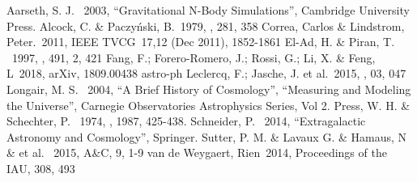 \documentclass[preprint]{aastex62}
\begin{document}
  \begin{thebibliography}{}

     Aarseth, S. J. \ 2003, ``Gravitational N-Body Simulations'', Cambridge University Press.
     Alcock, C. \& Paczy\'nski, B.\ 1979, \nat, 281, 358    
     Correa, Carlos \& Lindstrom, Peter.\ 2011,  IEEE TVCG\ 17,12 (Dec 2011), 1852-1861
     El-Ad, H. \& Piran, T. \ 1997, \apj, 491, 2, 421
     Fang, F.; Forero-Romero, J.; Rossi, G.; Li, X. \& Feng, L\ 2018, arXiv, 1809.00438 astro-ph
     Leclercq, F.; Jasche, J. et al.\ 2015, \jcap, 03, 047
     Longair, M. S. \ 2004, ``A Brief History of Cosmology'', ``Measuring and Modeling the Universe'', Carnegie Observatories Astrophysics Series, Vol 2.
     Press, W. H. \& Schechter, P. \ 1974, \apj, 1987, 425-438.
     Schneider, P. \ 2014, ``Extragalactic Astronomy and Cosmology'', Springer.
     Sutter, P. M. \& Lavaux G. \& Hamaus, N \& et al. \ 2015, A\&C, 9, 1-9
     van de Weygaert, Rien\ 2014, Proceedings of the IAU, 308, 493   
  
  \end{thebibliography}                                                           
                       

\end{document}
